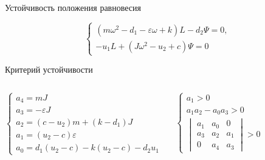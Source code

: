 \documentclass[ignoreonframetext,unicode]{beamer}
\begin{document}
\begin{frame}{Устойчивость положения равновесия}
\begin{block}{}
	\vspace*{-2mm}
	\begin{equation*}
		\begin{cases}
			\left( m \omega^2 - d_1 - \varepsilon \omega + k \right) L - d_2 \Psi = 0, \\
			- u_1 L + \left(J \omega^2 - u_2 + c \right) \Psi 	 = 0
		\end{cases}
		\label{kjdkjsnadkjddadsbafabjb}
	\end{equation*}
\end{block}


\vspace*{-2mm}
\begin{block}{Критерий устойчивости}
	\vspace*{-2mm}
	\begin{columns}
		
	\begin{equation*} 
		\begin{cases}
			a_4 = m J \\
			a_3 = - \varepsilon J \\
			a_2 = \left(c - u_2 \right) m + \left(k - d_1 \right)J \\
			a_1 = \left(u_2 - c\right) \varepsilon \\
			a_0 = d_1 \left( u_2 - c \right) - k \left( u_2 - c \right) - d_2 u_1
		\end{cases}
	\end{equation*}

		\begin{equation*} 
		\begin{cases}
			a_1 >  0 \\
			a_1 a_2 - a_0 a_3 > 0 \\
			\begin{vmatrix*}
				a_1 & a_0 & 0 \\
				a_3 & a_2 & a_1 \\
				0 & a_4 & a_3 
			\end{vmatrix*} > 0
		\end{cases}
	\end{equation*}
\end{columns}
\end{block}


	
\end{frame}
\end{document}
